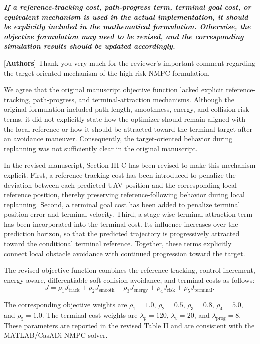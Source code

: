 \documentclass[12pt, twosides]{article}
\theoremstyle{definition}
\begin{document}
\textit{\textbf{If a reference-tracking cost, path-progress term, terminal goal cost, or equivalent mechanism is used in the actual implementation, it should be explicitly included in the mathematical formulation. Otherwise, the objective formulation may need to be revised, and the corresponding simulation results should be updated accordingly.}}

\textcolor[rgb]{0.00,0.00,1.00}{[\textbf{Authors}]} Thank you very much for the reviewer's important comment regarding the target-oriented mechanism of the high-risk NMPC formulation.

We agree that the original manuscript objective function lacked explicit reference-tracking, path-progress, and terminal-attraction mechanisms. Although the original formulation included path-length, smoothness, energy, and collision-risk terms, it did not explicitly state how the optimizer should remain aligned with the local reference or how it should be attracted toward the terminal target after an avoidance maneuver. Consequently, the target-oriented behavior during replanning was not sufficiently clear in the original manuscript.

In the revised manuscript, Section III-C has been revised to make this mechanism explicit. First, a reference-tracking cost has been introduced to penalize the deviation between each predicted UAV position and the corresponding local reference position, thereby preserving reference-following behavior during local replanning. Second, a terminal goal cost has been added to penalize terminal position error and terminal velocity. Third, a stage-wise terminal-attraction term has been incorporated into the terminal cost. Its influence increases over the prediction horizon, so that the predicted trajectory is progressively attracted toward the conditional terminal reference. Together, these terms explicitly connect local obstacle avoidance with continued progression toward the target.

The revised objective function combines the reference-tracking, control-increment, energy-aware, differentiable soft collision-avoidance, and terminal costs as follows:
\[
J = \rho_1 J_{\mathrm{track}} + \rho_2 J_{\mathrm{smooth}} + \rho_3 J_{\mathrm{energy}} + \rho_4 J_{\mathrm{risk}} + \rho_5 J_{\mathrm{terminal}}.
\]

The corresponding objective weights are $\rho_1=1.0$, $\rho_2=0.5$, $\rho_3=0.8$, $\rho_4=5.0$, and $\rho_5=1.0$. The terminal-cost weights are $\lambda_p=120$, $\lambda_v=20$, and $\lambda_{\mathrm{prog}}=8$. These parameters are reported in the revised Table II and are consistent with the MATLAB/CasADi NMPC solver.
\end{document}
